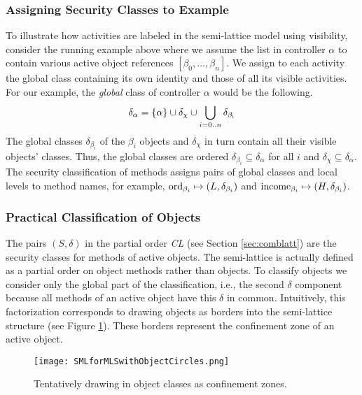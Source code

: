 \documentclass[10pt, conference, compsocconf]{IEEEtran}
\begin{document}
{\subsubsection*{Assigning Security Classes to Example}
To illustrate how activities are labeled in the semi-lattice model using visibility, 
consider the running example above where we assume the list in controller $\alpha$ to contain
various active object references $[\beta_0, \ldots, \beta_n]$.
We assign to each activity the global class containing its own identity and those of all 
its visible activities. 
For our example, the {\it global} class of controller $\alpha$ would 
be the following. 
\[\delta_{\alpha} = \{ \alpha\} \cup \delta_\chi \cup \bigcup_{i=0..n}{\rm \delta_{\beta_i}}\]
The global classes $\delta_{\beta_i}$ of the $\beta_i$ objects and $\delta_\chi$ in turn
contain all their visible objects' classes.
Thus, the global classes are ordered $\delta_{\beta_i} \subseteq \delta_\alpha$ for all $i$ and 
$\delta_\chi \subseteq \delta_\alpha$. The security classification of methods assigns
pairs of global classes and local levels to method names, for example,
${\rm ord}_{\beta_i} \mapsto (L, \delta_{\beta_i})$ and ${\rm income}_{\beta_i} \mapsto (H, \delta_{\beta_i})$.

\subsubsection*{Practical Classification of Objects}
The pairs $(S, \delta)$ in the partial order {\it CL} (see Section \ref{sec:comblatt})
are the security classes for methods of active objects. 
The semi-lattice is actually defined as a partial order on object methods rather than objects.
To classify objects we consider only the global part of the classification, i.e., the second
$\delta$ component because all methods of an active object have this $\delta$ in common.
Intuitively, this factorization corresponds to drawing objects as borders into the
semi-lattice structure (see Figure \ref{fig:slmmlsobj}). These borders represent the confinement zone
of an active object.  
\begin{figure}
\vspace{-3ex}
\begin{center}
\texttt{[image: SMLforMLSwithObjectCircles.png]}
\end{center}
\vspace{-3ex}
\caption{
Tentatively drawing in object classes as confinement zones.
\label{fig:slmmlsobj}}
\vspace{-3ex}
\end{figure}

}
\end{document}
